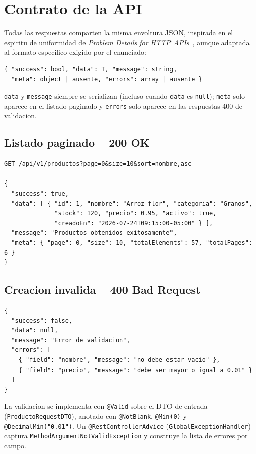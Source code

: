\documentclass[11pt,a4paper]{article}
\begin{document}
\section{Contrato de la API}

Todas las respuestas comparten la misma envoltura JSON, inspirada en el
espiritu de uniformidad de \emph{Problem Details for HTTP
APIs}~\cite{rfc7807}, aunque adaptada al formato especifico exigido por el
enunciado:

\begin{lstlisting}
{ "success": bool, "data": T, "message": string,
  "meta": object | ausente, "errors": array | ausente }
\end{lstlisting}

\texttt{data} y \texttt{message} siempre se serializan (incluso cuando
\texttt{data} es \texttt{null}); \texttt{meta} solo aparece en el listado
paginado y \texttt{errors} solo aparece en las respuestas 400 de
validacion.

\subsection{Listado paginado -- 200 OK}
\begin{lstlisting}
GET /api/v1/productos?page=0&size=10&sort=nombre,asc

{
  "success": true,
  "data": [ { "id": 1, "nombre": "Arroz flor", "categoria": "Granos",
              "stock": 120, "precio": 0.95, "activo": true,
              "creadoEn": "2026-07-24T09:15:00-05:00" } ],
  "message": "Productos obtenidos exitosamente",
  "meta": { "page": 0, "size": 10, "totalElements": 57, "totalPages": 6 }
}
\end{lstlisting}

\subsection{Creacion invalida -- 400 Bad Request} \label{sec:validacion}
\begin{lstlisting}
{
  "success": false,
  "data": null,
  "message": "Error de validacion",
  "errors": [
    { "field": "nombre", "message": "no debe estar vacio" },
    { "field": "precio", "message": "debe ser mayor o igual a 0.01" }
  ]
}
\end{lstlisting}

La validacion se implementa con \texttt{@Valid} sobre el DTO de entrada
(\texttt{ProductoRequestDTO}), anotado con \texttt{@NotBlank},
\texttt{@Min(0)} y \texttt{@DecimalMin("0.01")}. Un
\texttt{@RestControllerAdvice} (\texttt{GlobalExceptionHandler}) captura
\texttt{MethodArgumentNotValidException} y construye la lista de errores
por campo.
\end{document}

